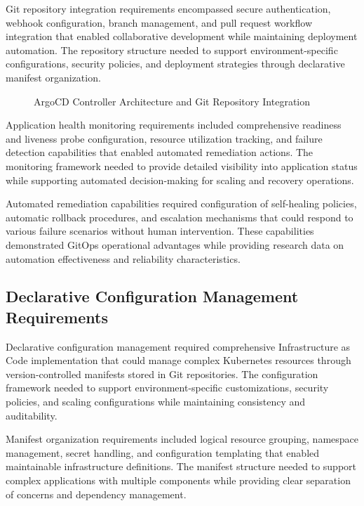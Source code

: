 Git repository integration requirements encompassed secure authentication, webhook configuration, branch management, and pull request workflow integration that enabled collaborative development while maintaining deployment automation. The repository structure needed to support environment-specific configurations, security policies, and deployment strategies through declarative manifest organization.

\begin{figure}[H]
\centering
\caption{ArgoCD Controller Architecture and Git Repository Integration}
\label{fig:argocd-architecture}
\end{figure}

Application health monitoring requirements included comprehensive readiness and liveness probe configuration, resource utilization tracking, and failure detection capabilities that enabled automated remediation actions. The monitoring framework needed to provide detailed visibility into application status while supporting automated decision-making for scaling and recovery operations.

Automated remediation capabilities required configuration of self-healing policies, automatic rollback procedures, and escalation mechanisms that could respond to various failure scenarios without human intervention. These capabilities demonstrated GitOps operational advantages while providing research data on automation effectiveness and reliability characteristics.

\subsection{Declarative Configuration Management Requirements}

Declarative configuration management required comprehensive Infrastructure as Code implementation that could manage complex Kubernetes resources through version-controlled manifests stored in Git repositories. The configuration framework needed to support environment-specific customizations, security policies, and scaling configurations while maintaining consistency and auditability.

Manifest organization requirements included logical resource grouping, namespace management, secret handling, and configuration templating that enabled maintainable infrastructure definitions. The manifest structure needed to support complex applications with multiple components while providing clear separation of concerns and dependency management.

